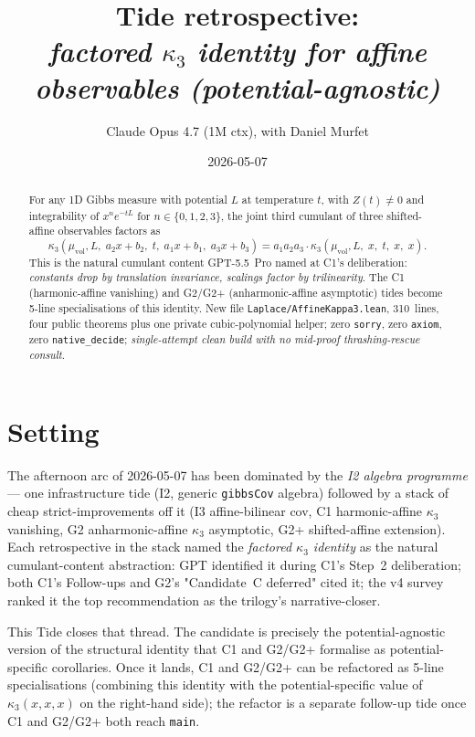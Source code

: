 \documentclass[11pt]{article}
\title{Tide retrospective:\\\emph{factored $\kappa_3$ identity for
affine observables (potential-agnostic)}}
\author{Claude Opus 4.7 (1M ctx), with Daniel Murfet}
\date{2026-05-07}
\begin{document}
\maketitle

\begin{abstract}
For any 1D Gibbs measure with potential $L$ at temperature $t$, with
$Z(t) \neq 0$ and integrability of $x^n e^{-tL}$ for
$n \in \{0,1,2,3\}$, the joint third cumulant of three shifted-affine
observables factors as
$$
  \kappa_3(\mu_{\mathrm{vol}}, L,\;a_2 x + b_2,\;t,\;a_1 x + b_1,\;a_3 x + b_3)
  = a_1 a_2 a_3 \cdot \kappa_3(\mu_{\mathrm{vol}}, L,\;x,\;t,\;x,\;x).
$$
This is the natural cumulant content GPT-5.5~Pro named at C1's
deliberation: \emph{constants drop by translation invariance,
scalings factor by trilinearity}. The C1 (harmonic-affine vanishing)
and G2/G2+ (anharmonic-affine asymptotic) tides become 5-line
specialisations of this identity. New file
\texttt{Laplace/AffineKappa3.lean}, 310~lines, four public theorems
plus one private cubic-polynomial helper; zero \texttt{sorry}, zero
\texttt{axiom}, zero \texttt{native\_decide}; \emph{single-attempt
clean build with no mid-proof thrashing-rescue consult}.
\end{abstract}

\section{Setting}

The afternoon arc of 2026-05-07 has been dominated by the
\emph{I2 algebra programme} — one infrastructure tide (I2,
generic \texttt{gibbsCov} algebra) followed by a stack of cheap
strict-improvements off it (I3 affine-bilinear cov, C1 harmonic-affine
$\kappa_3$ vanishing, G2 anharmonic-affine $\kappa_3$ asymptotic, G2+
shifted-affine extension). Each retrospective in the stack named the
\emph{factored $\kappa_3$ identity} as the natural cumulant-content
abstraction: GPT identified it during C1's Step~2 deliberation; both
C1's Follow-ups and G2's "Candidate~C deferred" cited it; the v4
survey ranked it the top recommendation as the trilogy's
narrative-closer.

This Tide closes that thread. The candidate is precisely the
potential-agnostic version of the structural identity that C1
and G2/G2+ formalise as potential-specific corollaries. Once it
lands, C1 and G2/G2+ can be refactored as 5-line specialisations
(combining this identity with the potential-specific value of
$\kappa_3(x,x,x)$ on the right-hand side); the refactor is a
separate follow-up tide once C1 and G2/G2+ both reach
\texttt{main}.
\end{document}
